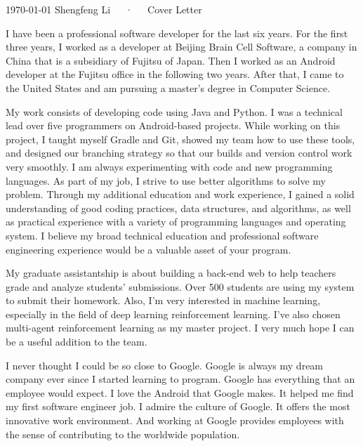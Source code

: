 \documentclass[11pt, a4paper]{awesome-cv}
\begin{document}
\makecvheader[R]

\makecvfooter
  {\today}
  {Shengfeng Li~~~·~~~Cover Letter}
  {}

\makelettertitle

\begin{cvletter}

I have been a professional software developer for the last six years. For the first three years, I worked as a developer at Beijing Brain Cell Software, a company in China that is a subsidiary of Fujitsu of Japan. Then I worked as an Android developer at the Fujitsu office in the following two years. After that, I came to the United States and am pursuing a master's degree in Computer Science. 

My work consists of developing code using Java and Python. I was a technical lead over five programmers on Android-based projects. While working on this project, I taught myself Gradle and Git, showed my team how to use these tools, and designed our branching strategy so that our builds and version control work very smoothly. I am always experimenting with code and new programming languages. As part of my job, I strive to use better algorithms to solve my problem. Through my additional education and work experience, I gained a solid understanding of good coding practices, data structures, and algorithms, as well as practical experience with a variety of programming languages and operating system. I believe my broad technical education and professional software engineering experience would be a valuable asset of your program.

My graduate assistantship is about building a back-end web to help teachers grade and analyze students' submissions. Over 500 students are using my system to submit their homework. Also, I'm very interested in machine learning, especially in the field of deep learning reinforcement learning. I've also chosen multi-agent reinforcement learning as my master project.  I very much hope I can be a useful addition to the team.


I never thought I could be so close to Google. Google is always my dream company ever since I started learning to program. Google has everything that an employee would expect. I love the Android that Google makes. It helped me find my first software engineer job. I admire the culture of Google. It offers  the most innovative work environment. And working at Google provides employees with the sense of contributing to the worldwide population.


\end{cvletter}
\end{document}
